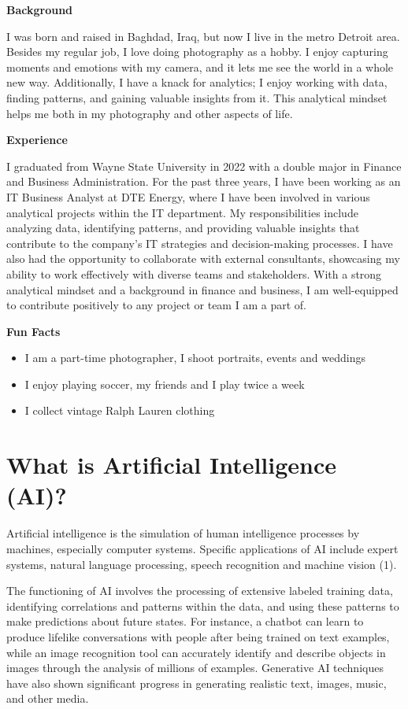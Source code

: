 \documentclass[
]{book}
\begin{document}
\textbf{Background}

I was born and raised in Baghdad, Iraq, but now I live in the metro Detroit area. Besides my regular job, I love doing photography as a hobby. I enjoy capturing moments and emotions with my camera, and it lets me see the world in a whole new way. Additionally, I have a knack for analytics; I enjoy working with data, finding patterns, and gaining valuable insights from it. This analytical mindset helps me both in my photography and other aspects of life.

\textbf{Experience}

I graduated from Wayne State University in 2022 with a double major in Finance and Business Administration. For the past three years, I have been working as an IT Business Analyst at DTE Energy, where I have been involved in various analytical projects within the IT department. My responsibilities include analyzing data, identifying patterns, and providing valuable insights that contribute to the company's IT strategies and decision-making processes. I have also had the opportunity to collaborate with external consultants, showcasing my ability to work effectively with diverse teams and stakeholders. With a strong analytical mindset and a background in finance and business, I am well-equipped to contribute positively to any project or team I am a part of.

\textbf{Fun Facts}

\begin{itemize}
\item
  I am a part-time photographer, I shoot portraits, events and weddings
\item
  I enjoy playing soccer, my friends and I play twice a week
\item
  I collect vintage Ralph Lauren clothing
\end{itemize}

\hypertarget{what-is-artificial-intelligence-ai}{%
\chapter{What is Artificial Intelligence (AI)?}\label{what-is-artificial-intelligence-ai}}

Artificial intelligence is the simulation of human intelligence processes by machines, especially computer systems. Specific applications of AI include expert systems, natural language processing, speech recognition and machine vision (1).

The functioning of AI involves the processing of extensive labeled training data, identifying correlations and patterns within the data, and using these patterns to make predictions about future states. For instance, a chatbot can learn to produce lifelike conversations with people after being trained on text examples, while an image recognition tool can accurately identify and describe objects in images through the analysis of millions of examples. Generative AI techniques have also shown significant progress in generating realistic text, images, music, and other media.
\end{document}
